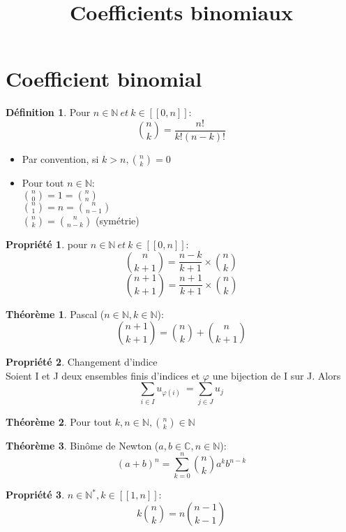 \documentclass[fleqn]{article}
\title{Coefficients binomiaux}
\date{}
\theoremstyle{definition} \newtheorem*{defi}{D\'efinition}
\theoremstyle{definition} \newtheorem*{theo}{Th\'eor\`eme}
\theoremstyle{definition} \newtheorem*{prop}{Propri\'et\'e}
\begin{document}
\maketitle

\section{Coefficient binomial}
\begin{defi}
	Pour \(n \in \mathbb{N}\ et\ k \in [\![0,n]\!]\): \\
	\[ \binom{n}{k} = \frac{n!}{k!(n-k)!} \]
\end{defi}
\begin{itemize}
	\item Par convention, si $k>n, \binom{n}{k} = 0$
	\item Pour tout \(n \in \mathbb{N}:\) \\
		$\binom{n}{0} = 1 = \binom{n}{n}$ \\
		$\binom{n}{1} = n = \binom{n}{n-1}$ \\
		$\binom{n}{k} = \binom{n}{n-k}$ (sym\'etrie)
\end{itemize}
\begin{prop} pour \(n \in \mathbb{N}\ et\ k \in [\![0,n]\!]\):
	\[\binom{n}{k+1} = \frac{n-k}{k+1} \times \binom{n}{k} \]
	\[\binom{n+1}{k+1} = \frac{n+1}{k+1} \times \binom{n}{k} \]
\end{prop}
\begin{theo} Pascal (\(n \in \mathbb{N}, k \in \mathbb{N}\)): \\
	\[\binom{n+1}{k+1} = \binom{n}{k} + \binom{n}{k+1}\]
\end{theo}
\begin{prop} Changement d'indice\\
	Soient I et J deux ensembles finis d'indices et $\varphi$ une bijection de I sur J. Alors
	\[\underset{i \in I}{\sum} u_{\varphi(i)}\ = \underset{j \in J}{\sum} u_j\]

\end{prop}
\begin{theo}
	Pour tout \(k,n \in \mathbb{N}, \binom{n}{k} \in \mathbb{N}\)
\end{theo}
\begin{theo} Bin\^{o}me de Newton (\(a,b \in \mathbb{C}, n \in \mathbb{N}\)):
	\[(a+b)^n = \sum_{k=0}^{n} \binom{n}{k}a^kb^{n-k}\]
\end{theo}
\begin{prop} \(n \in \mathbb{N}^*, k \in [\![1,n]\!]\): \\
	\[k\binom{n}{k} = n\binom{n-1}{k-1}\] \\
\end{prop}
\end{document}
